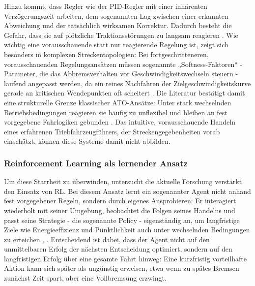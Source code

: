 Hinzu kommt, dass Regler wie der \gls{PID}-Regler mit einer inhärenten Verzögerungszeit arbeiten, dem sogenannten Lag zwischen einer erkannten Abweichung und der tatsächlich wirksamen Korrektur. Dadurch besteht die Gefahr, dass sie auf plötzliche Traktionsstörungen zu langsam reagieren \cite[vgl.~S.~4f.]{chap3_Dun25}. Wie wichtig eine vorausschauende statt nur reagierende Regelung ist, zeigt sich besonders in komplexen Streckentopologien: Bei fortgeschritteneren, vorausschauenden Regelungsansätzen müssen sogenannte „Softness-Faktoren“ - Parameter, die das Abbremsverhalten vor Geschwindigkeitswechseln steuern - laufend angepasst werden, da ein reines Nachfahren der Zielgeschwindigkeitskurve gerade an kritischen Wendepunkten oft scheitert \cite[vgl.~S.~15]{chap3_Liu19}. Die Literatur bestätigt damit eine strukturelle Grenze klassischer \gls{ATO}-Ansätze: Unter stark wechselnden Betriebsbedingungen reagieren sie häufig zu unflexibel und bleiben an fest vorgegebene Fahrlogiken gebunden \cite[vgl.~S.~1f.]{chap1_Huang25}. Das intuitive, vorausschauende Handeln eines erfahrenen Triebfahrzeugführers, der Streckengegebenheiten vorab einschätzt, können diese Systeme damit nicht abbilden.

\subsubsection{Reinforcement Learning als lernender Ansatz}
\label{sec:cold_start}

Um diese Starrheit zu überwinden, untersucht die aktuelle Forschung verstärkt den Einsatz von \gls{RL}. Bei diesem Ansatz lernt ein sogenannter Agent nicht anhand fest vorgegebener Regeln, sondern durch eigenes Ausprobieren: Er interagiert wiederholt mit seiner Umgebung, beobachtet die Folgen seines Handelns und passt seine Strategie - die sogenannte Policy - eigenständig an, um langfristige Ziele wie Energieeffizienz und Pünktlichkeit auch unter wechselnden Bedingungen zu erreichen \cite[vgl.~S.~1]{chap3_Sha26}, \cite[vgl.~S.~1]{chap3_Lyu26}. Entscheidend ist dabei, dass der Agent nicht auf den unmittelbaren Erfolg der nächsten Entscheidung optimiert, sondern auf den langfristigen Erfolg über eine gesamte Fahrt hinweg: Eine kurzfristig vorteilhafte Aktion kann sich später als ungünstig erweisen, etwa wenn zu spätes Bremsen zunächst Zeit spart, aber eine Vollbremsung erzwingt.


